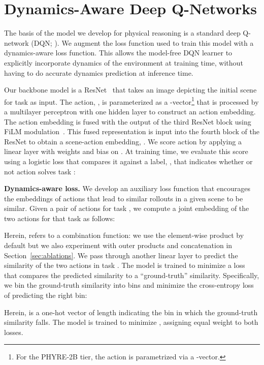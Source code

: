 \documentclass{article}
\begin{document}
 \section{Dynamics-Aware Deep Q-Networks}\label{sect:appr}

The basis of the model we develop for physical reasoning is a standard deep Q-network (DQN; \cite{mnih-atari-2013,bakhtin2019phyre}).
We augment the loss function used to train this model with a dynamics-aware loss function. 
This allows the model-free DQN learner to explicitly incorporate dynamics of the environment at training time, without having to do accurate dynamics prediction at inference time.

Our backbone model is a ResNet~\cite{He_16} that takes an image depicting the initial scene for task  as input. 
The action, , is parameterized as a -vector\footnote{For the  PHYRE-2B tier, the action is parametrized via a -vector.} that is processed by a multilayer perceptron with one hidden layer to construct an action embedding.
The action embedding is fused with the output of the third ResNet block using FiLM modulation~\cite{perez2017film}. This fused representation is input into the fourth block of the ResNet to obtain a scene-action embedding, . 
We score action  by applying a linear layer with weights  and bias  on .
At training time, we evaluate this score using a logistic loss that compares it against a label, , that indicates whether or not action  solves task :




\noindent\textbf{Dynamics-aware loss.} We develop an auxiliary loss function that encourages the embeddings of actions that lead to similar rollouts in a given scene to be similar.
Given a pair of actions  for task ,
we compute a joint embedding of the two actions  for that task as follows:


Herein,  refers to a combination function: we use the element-wise product by default but we also experiment with outer products and concatenation in Section~\ref{sec:ablations}.
We pass  through another linear layer to predict the similarity of the two actions in task . 
The model is trained to minimize a loss that compares the predicted similarity to a ``ground-truth'' similarity.
Specifically, we bin the ground-truth similarity into  bins and minimize the cross-entropy loss of predicting the right bin:

Herein,  is a one-hot vector of length  indicating the bin in which the ground-truth similarity falls.
The model is trained to minimize , assigning equal weight to both losses.
\end{document}
